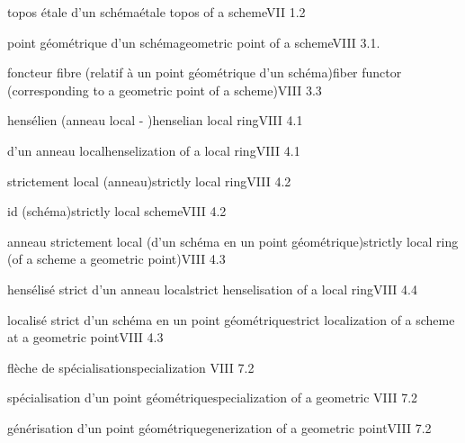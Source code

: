 topos étale d'un schéma\quad étale topos of a scheme\quad VII 1.2


point géométrique d'un schéma\quad geometric point of a scheme\quad VIII 3.1.

foncteur fibre (relatif à un point géométrique d'un schéma)\quad fiber functor (corresponding to a geometric point of a scheme)\quad VIII 3.3


hensélien (anneau local - )\quad henselian local ring\quad VIII 4.1

  d'un anneau local\quad henselization of a local ring\quad VIII 4.1

strictement local (anneau)\quad strictly local ring\quad VIII 4.2

\handwritten{---} id \handwritten{---} (schéma)\quad strictly local scheme\quad VIII 4.2

anneau strictement local (d'un schéma en un point géométrique)\quad strictly local ring (of a scheme  a geometric point)\quad VIII 4.3

hensélisé strict d'un anneau local\quad strict hens\deleted{\unsure{\'{}}}elisation of a local ring\quad VIII 4.4

localisé strict d'un schéma en un point géométrique\quad strict localization of a scheme at a geometric point\quad VIII 4.3

flèche de spécialisation\quad specialization \quad VIII 7.2

spécialisation d'un point géométrique\quad specialization of a geometric \quad VIII 7.2

générisation d'un point géométrique\quad generization of a geometric point\quad VIII 7.2


